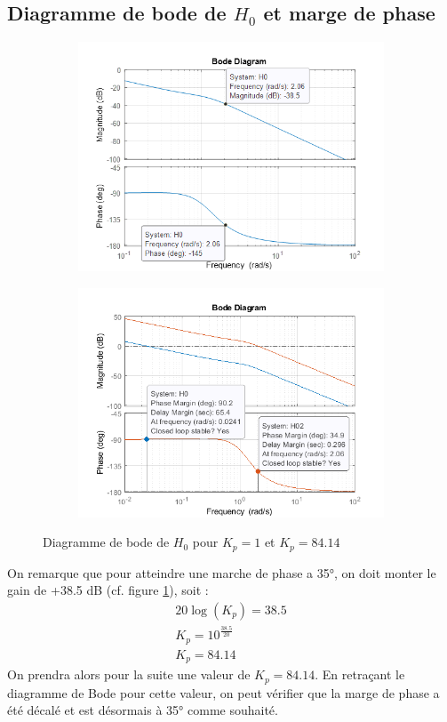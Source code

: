 \documentclass{article}
\begin{document}
\subsection{Diagramme de bode de $H_0$ et marge de phase}
\begin{figure}[h]
    \centering
    \begin{subfigure}{0.45\textwidth}
        \centering
        \includegraphics[width=1\textwidth]{bode325.png}
        \label{fig:bode325}
    \end{subfigure}
    \hfill
    \begin{subfigure}{0.45\textwidth}
        \centering
        \includegraphics[width=1\textwidth]{bode325_2.png}
        \label{fig:bode325_2}
    \end{subfigure}
    \caption{Diagramme de bode de $H_0$ pour $K_p=1$ et $K_p=84.14$}
\end{figure}
On remarque que pour atteindre une marche de phase a 35°, on doit monter le gain de +38.5 dB (cf. figure \ref{fig:bode325}), soit :
\begin{gather*}
    20\log(K_p)=38.5\\
    K_p=10^{\frac{38.5}{20}}\\
    K_p=84.14
\end{gather*}
On prendra alors pour la suite une valeur de $K_p=84.14$.
En retraçant le diagramme de Bode pour cette valeur, on peut vérifier que la marge de phase a été décalé et est désormais à 35° comme souhaité.
\end{document}
